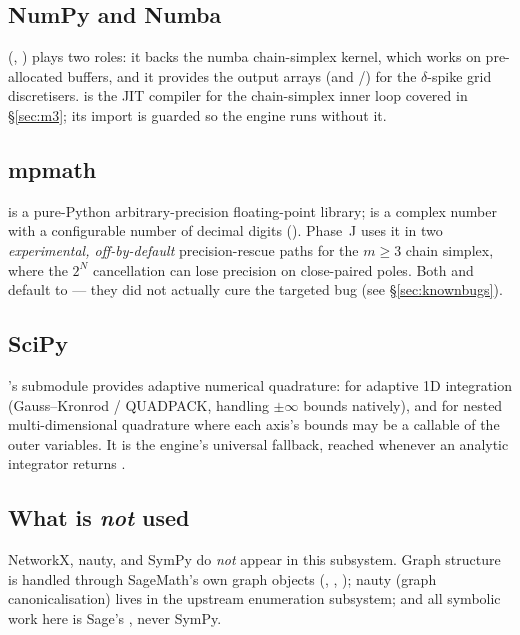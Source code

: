 \subsection{NumPy and Numba}

 (, ) plays two
roles: it backs the numba chain-simplex kernel, which works on pre-allocated
 buffers, and it provides the output arrays (and
/) for the $\delta$-spike grid discretisers.
 is the JIT compiler for the chain-simplex inner loop covered in
\S\ref{sec:m3}; its import is guarded so the engine runs without it.

\subsection{mpmath}

 is a pure-Python arbitrary-precision floating-point library;
 is a complex number with a configurable number of decimal
digits (). Phase~J uses it in two \emph{experimental,
off-by-default} precision-rescue paths for the $m\ge 3$ chain simplex, where the
$2^N$ cancellation can lose precision on close-paired poles. Both
 and
 default to  --- they did not
actually cure the targeted bug (see \S\ref{sec:knownbugs}).

\subsection{SciPy}

's  submodule provides adaptive numerical quadrature:
 for adaptive 1D integration (Gauss--Kronrod / QUADPACK,
handling $\pm\infty$ bounds natively), and  for nested
multi-dimensional quadrature where each axis's bounds may be a callable of the
outer variables. It is the engine's universal fallback, reached whenever an
analytic integrator returns .

\subsection{What is \emph{not} used}

NetworkX, nauty, and SymPy do \emph{not} appear in this subsystem. Graph
structure is handled through SageMath's own graph objects
(, , ); nauty (graph
canonicalisation) lives in the upstream enumeration subsystem; and all symbolic
work here is Sage's , never SymPy.


